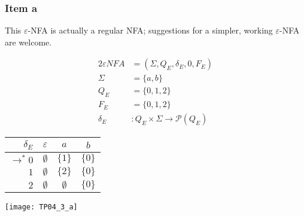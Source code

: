 {\subsubsection{Item a}
This $\varepsilon$-NFA is actually a regular NFA; suggestions for a simpler, working $\varepsilon$-NFA are welcome.
\begin{center}
	\begin{minipage}[c]{0.30\textwidth}
		\begin{alignat*}{2}
			\varepsilon NFA &= (\Sigma, Q_E, \delta_E, 0, F_E)\\
			\Sigma &= \{a,b\}\\
			Q_E    &= \{0,1,2\}\\
			F_E    &= \{0,1,2\}\\
			\delta_E &\colon Q_E \times \Sigma \rightarrow \mathscr{P}(Q_E)
		\end{alignat*}
	\end{minipage}
	\begin{minipage}[c]{0.25\textwidth}
		\begin{center}
		\begin{tabular}{ r | c c c }
 			$\delta_E          $ & $\varepsilon$ & $a    $ & $b    $ \\ \hline
 			$\rightarrow^\ast 0$ & $\emptyset$ & $\{1\}$ & $\{0\}$ \\  
 			$                 1$ & $\emptyset$ & $\{2\}$ & $\{0\}$ \\
 			$                 2$ & $\emptyset$ & $\emptyset$ & $\{0\}$
		\end{tabular}
		\end{center}
	\end{minipage}
	\begin{minipage}[c]{0.35\textwidth}
		\begin{center} \texttt{[image: TP04\_3\_a]} \end{center}
	\end{minipage}
\end{center}
}
